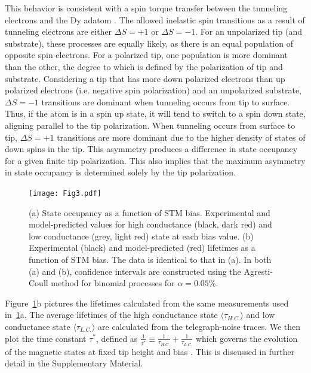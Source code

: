 \documentclass[
reprint,amsmath,amssymb,aps]{revtex4-2}
\begin{document}
This behavior is consistent with a spin torque transfer between the tunneling electrons and the Dy adatom \citep{krause_joule_2011,delgado2010,Khajetoorians2013}. The allowed inelastic spin transitions as a result of tunneling electrons are either $\Delta S = +1$ or $\Delta S = -1$. For an unpolarized tip (and substrate), these processes are equally likely, as there is an equal population of opposite spin electrons. For a polarized tip, one population is more dominant than the other, the degree to which is defined by the polarization of tip and substrate. Considering a tip that has more down polarized electrons than up polarized electrons (i.e. negative spin polarization) and an unpolarized substrate, $\Delta S = -1$ transitions are dominant when tunneling occurs from tip to surface. Thus, if the atom is in a spin up state, it will tend to switch to a spin down state, aligning parallel to the tip polarization. When tunneling occurs from surface to tip, $\Delta S = +1$ transitions are more dominant due to the higher density of states of down spins in the tip. This asymmetry produces a difference in state occupancy for a given finite tip polarization. This also implies that the maximum asymmetry in state occupancy is determined solely by the tip polarization.\par

\begin{figure}[h]
\texttt{[image: Fig3.pdf]}
\caption{(a) State occupancy as a function of STM bias. Experimental and model-predicted values for high conductance (black, dark red) and low conductance (grey, light red) state at each bias value. (b) Experimental (black) and model-predicted (red) lifetimes as a function of STM bias. The data is identical to that in (a). In both (a) and (b), confidence intervals are constructed using the Agresti-Coull method for binomial processes for $\alpha = 0.05 \%$.
\label{fig:occ} }
\end{figure}

Figure~\ref{fig:occ}b pictures the lifetimes calculated from the same measurements used in~\ref{fig:occ}a. The average lifetimes of the high conductance state $\langle \tau_{H.C.} \rangle$ and low conductance state $\langle \tau_{L.C.} \rangle$ are calculated from the telegraph-noise traces. We then plot the time constant $\tau^*$, defined as $\frac{1}{\tau^*}\equiv\frac{1}{\tau_{H.C.}}+\frac{1}{\tau_{L.C.}}$ which governs the evolution of the magnetic states at fixed tip height and bias \citep{Khajetoorians2013}. This is discussed in further detail in the Supplementary Material.\par 
\end{document}
